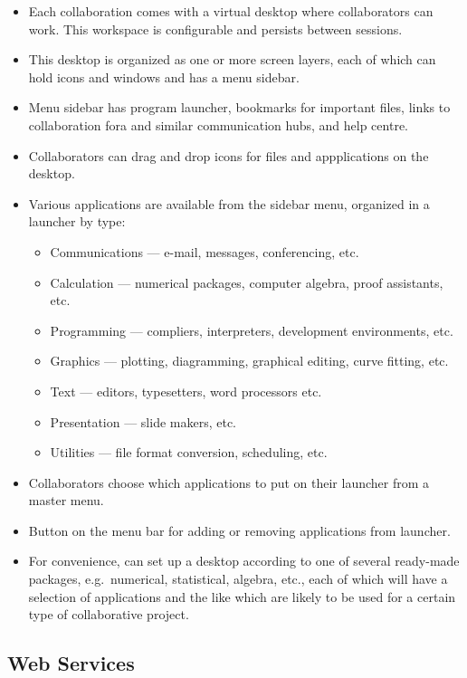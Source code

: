 \begin{itemize}
\begin{itemize}
\item
  Each collaboration comes with a virtual desktop where collaborators
  can work. This workspace is configurable and persists between
  sessions.
\item
  This desktop is organized as one or more screen layers, each of which
  can hold icons and windows and has a menu sidebar.
\item
  Menu sidebar has program launcher, bookmarks for important files,
  links to collaboration fora and similar communication hubs, and help
  centre.
\item
  Collaborators can drag and drop icons for files and appplications on
  the desktop.
\item
  Various applications are available from the sidebar menu, organized in
  a launcher by type: 
  \begin{itemize}
  \item
    Communications --- e-mail, messages, conferencing, etc. 
  \item  
    Calculation --- numerical packages, computer algebra, proof 
    assistants, etc. 
  \item  
    Programming --- compliers, interpreters, development environments, etc. 
  \item  
    Graphics --- plotting, diagramming, graphical editing, curve fitting, etc. 
  \item  
    Text --- editors, typesetters, word processors etc.
  \item  
    Presentation --- slide makers, etc. 
  \item  
    Utilities --- file format conversion, scheduling, etc.
  \end{itemize}  
\item
  Collaborators choose which applications to put on their launcher from
  a master menu.
\item
  Button on the menu bar for adding or removing applications from
  launcher.
\item
  For convenience, can set up a desktop according to one of several
  ready-made packages, e.g.~numerical, statistical, algebra, etc., each
  of which will have a selection of applications and the like which are
  likely to be used for a certain type of collaborative project.
\end{itemize}

\subsection{Web Services}


\end{itemize}
